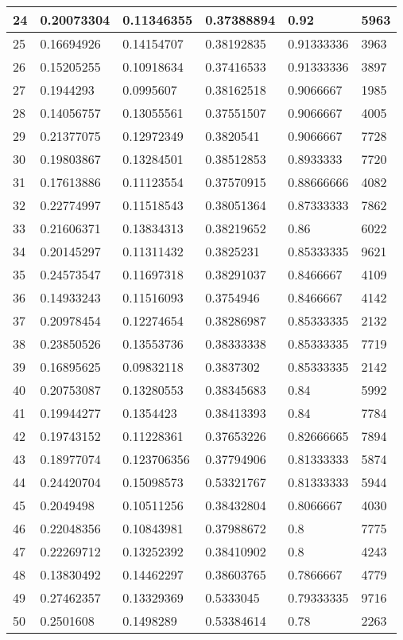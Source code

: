 \begin{longtable}{|l|l|l|l|l|l|}
24 & 0.20073304 & 0.11346355 & 0.37388894 & 0.92 & 5963 \\ \hline 
25 & 0.16694926 & 0.14154707 & 0.38192835 & 0.91333336 & 3963 \\ \hline 
26 & 0.15205255 & 0.10918634 & 0.37416533 & 0.91333336 & 3897 \\ \hline 
27 & 0.1944293 & 0.0995607 & 0.38162518 & 0.9066667 & 1985 \\ \hline 
28 & 0.14056757 & 0.13055561 & 0.37551507 & 0.9066667 & 4005 \\ \hline 
29 & 0.21377075 & 0.12972349 & 0.3820541 & 0.9066667 & 7728 \\ \hline 
30 & 0.19803867 & 0.13284501 & 0.38512853 & 0.8933333 & 7720 \\ \hline 
31 & 0.17613886 & 0.11123554 & 0.37570915 & 0.88666666 & 4082 \\ \hline 
32 & 0.22774997 & 0.11518543 & 0.38051364 & 0.87333333 & 7862 \\ \hline 
33 & 0.21606371 & 0.13834313 & 0.38219652 & 0.86 & 6022 \\ \hline 
34 & 0.20145297 & 0.11311432 & 0.3825231 & 0.85333335 & 9621 \\ \hline 
35 & 0.24573547 & 0.11697318 & 0.38291037 & 0.8466667 & 4109 \\ \hline 
36 & 0.14933243 & 0.11516093 & 0.3754946 & 0.8466667 & 4142 \\ \hline 
37 & 0.20978454 & 0.12274654 & 0.38286987 & 0.85333335 & 2132 \\ \hline 
38 & 0.23850526 & 0.13553736 & 0.38333338 & 0.85333335 & 7719 \\ \hline 
39 & 0.16895625 & 0.09832118 & 0.3837302 & 0.85333335 & 2142 \\ \hline 
40 & 0.20753087 & 0.13280553 & 0.38345683 & 0.84 & 5992 \\ \hline 
41 & 0.19944277 & 0.1354423 & 0.38413393 & 0.84 & 7784 \\ \hline 
42 & 0.19743152 & 0.11228361 & 0.37653226 & 0.82666665 & 7894 \\ \hline 
43 & 0.18977074 & 0.123706356 & 0.37794906 & 0.81333333 & 5874 \\ \hline 
44 & 0.24420704 & 0.15098573 & 0.53321767 & 0.81333333 & 5944 \\ \hline 
45 & 0.2049498 & 0.10511256 & 0.38432804 & 0.8066667 & 4030 \\ \hline 
46 & 0.22048356 & 0.10843981 & 0.37988672 & 0.8 & 7775 \\ \hline 
47 & 0.22269712 & 0.13252392 & 0.38410902 & 0.8 & 4243 \\ \hline 
48 & 0.13830492 & 0.14462297 & 0.38603765 & 0.7866667 & 4779 \\ \hline 
49 & 0.27462357 & 0.13329369 & 0.5333045 & 0.79333335 & 9716 \\ \hline 
50 & 0.2501608 & 0.1498289 & 0.53384614 & 0.78 & 2263 \\ \hline 
\end{longtable}